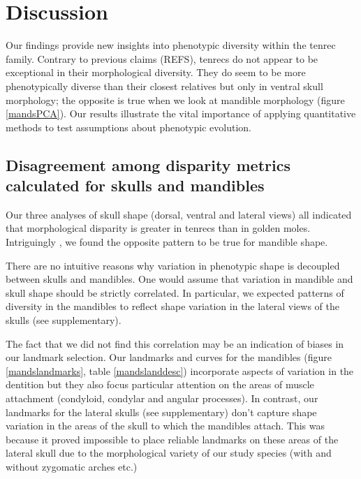 \documentclass[12pt,a4paper]{article}
\begin{document}
\section{Discussion} %

Our findings provide new insights into phenotypic diversity within the tenrec family. Contrary to previous claims (REFS), tenrecs do not appear to be exceptional in their morphological diversity. They do seem to be more phenotypically diverse than their closest relatives but only in ventral skull morphology; the opposite is true when we look at mandible morphology (figure \ref{mandsPCA}). Our results illustrate the vital importance of applying quantitative methods to test assumptions about phenotypic evolution. %

\subsection{Disagreement among disparity metrics calculated for skulls and mandibles}

Our three analyses of skull shape (dorsal, ventral and lateral views) all indicated that morphological disparity is greater in tenrecs than in golden moles. Intriguingly %
, we found the opposite pattern to be true for mandible shape.

There are no intuitive reasons why variation in phenotypic shape is decoupled between skulls and mandibles. One would assume that variation in mandible and skull shape should be strictly correlated. In particular, we expected patterns of diversity in the mandibles to reflect shape variation in the lateral views of the skulls (see supplementary). %

The fact that we did not find this correlation may be an indication of biases in our landmark selection. Our landmarks and curves for the mandibles (figure \ref{mandslandmarks}, table \ref{mandslanddesc}) incorporate aspects of variation in the dentition but they also focus particular attention on the areas of muscle attachment (condyloid, condylar and angular processes). In contrast, our landmarks for the lateral skulls (see supplementary) don't capture shape variation in the areas of the skull to which the mandibles attach. This was because it proved impossible to place reliable landmarks on these areas of the lateral skull due to the morphological variety of our study species (with and without zygomatic arches etc.)
\end{document}
